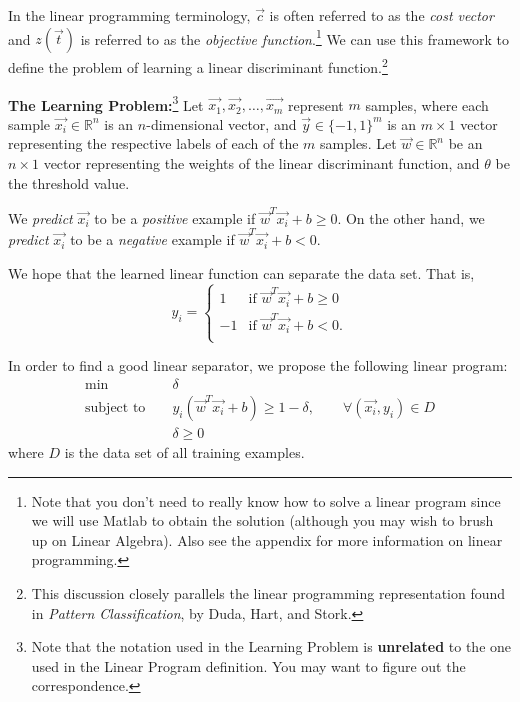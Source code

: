 \documentclass[11pt]{article}
\begin{document}
In the linear programming terminology, $\vec{c}$ is often referred
to as the {\em cost vector} and $z(\vec{t})$ is referred to as the {\em objective
function}.\footnote{Note that you don't need
to really know how to solve a linear program since we will use Matlab to obtain the
solution (although you may wish to brush up on Linear Algebra). 
Also see the appendix for more information on linear programming.}
We can use this framework to define the problem of learning a linear
discriminant function.\footnote{This discussion closely
  parallels the linear programming representation found in 
  {\em Pattern Classification}, by Duda, Hart, and Stork.}

\textbf{The Learning Problem:}\footnote{Note that the notation used in the
Learning Problem is
{\bf unrelated} to the one used in the Linear Program definition. You may want to
figure out the correspondence.} \hspace{2mm}
Let $\vec{x_1}, \vec{x_2}, \ldots, \vec{x_m}$ 
represent $m$ samples, where each sample $\vec{x_i}\in \mathbb{R}^n$ is an $n$-dimensional
vector, and $\vec{y} \in \{-1, 1\}^m$ is an $m \times 1$
vector representing the respective labels of each of the $m$ samples. Let
$\vec{w} \in \mathbb{R}^n$ be an $n \times 1$ vector representing the weights of the
linear discriminant function, and $\theta$ be the threshold value. 

We {\em predict} $\vec{x_i}$ to be a {\em positive} example if
$\vec{w}^T \vec{x_i} + b \geq 0$. On the other hand, we {\em predict}
$\vec{x_i}$ to be a {\em negative} example if $\vec{w}^T \vec{x_i} + b < 0$.

We hope that the learned linear function can separate the data set.  
That is,
\begin{equation}
\label{eq:separable}
y_i = \begin{cases}
 1 & \mbox{if } \vec{w}^T \vec{x_i} + b \ge 0 \\
-1 & \mbox{if } \vec{w}^T \vec{x_i} + b < 0. \\
\end{cases}
\end{equation}

In order to find a good linear separator, we propose the following linear program:
\begin{eqnarray}
  \min & & \delta  \nonumber \\
 \textrm{subject to } & & y_i(\vec{w}^T \vec{x_i} + b ) \geq 1 - \delta, \qquad \forall (\vec{x_i},y_i) \in D \nonumber  \\
  & & \delta \geq 0  \label{eq:lin_prog_discriminant_bound}
\end{eqnarray}
where $D$ is the data set of all training examples.
\end{document}
